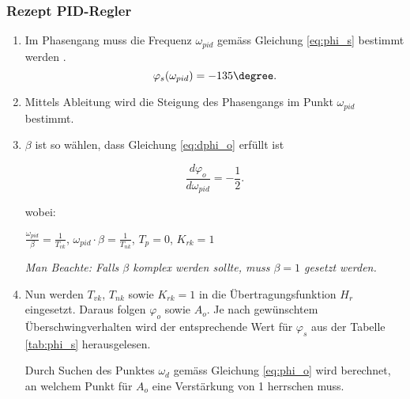 \clearpage
\subsubsection{Rezept PID-Regler}


\begin{enumerate}
    \item
        Im  Phasengang muss  die  Frequenz  $\omega_{pid}$ gem\"ass  Gleichung
        \ref{eq:phi_s} bestimmt werden \footnotemark[1].
        \begin{equation} \label{eq:phi_s}
            \varphi_s(\omega_{pid}) = -135 \degree.
        \end{equation}
    \item
        Mittels  Ableitung  wird  die  Steigung des  Phasengangs  im  Punkt  $
        \omega_{pid} $ bestimmt.
    \item
        $\beta$ ist so w\"ahlen, dass Gleichung \ref{eq:dphi_o} erf\"ullt ist

        \begin{equation} \label{eq:dphi_o}
            \frac{d\varphi_o}{d\omega_{pid}}= -\frac{1}{2}.
        \end{equation}

        wobei:
        \vspace*{1em}

        \begin{center}
            $\frac{\omega_{pid}}{\beta}=\frac{1}{T_{vk}}$,
            $\omega_{pid} \cdot \beta=\frac{1}{T_{nk}}$,
            $T_p = 0$,
            $K_{rk} = 1$
        \end{center}

        \vspace*{1em}
        {\em{Man Beachte: Falls $\beta$ komplex werden sollte, muss $\beta=1$ gesetzt werden.}}
        \vspace*{1em}
    \item
        Nun   werden    $T_{vk}$,   $T_{nk}$   sowie   $K_{rk}=1$    in   die
        \"Ubertragungsfunktion  $H_r$  eingesetzt. Daraus folgen  $\varphi_o$
        sowie $A_o$.   Je nach  gew\"unschtem \"Uberschwingverhalten  wird der
        entsprechende Wert  f\"ur $\varphi_s$ aus der  Tabelle \ref{tab:phi_s}
        herausgelesen.

        Durch Suchen des Punktes  $\omega_d$ gem\"ass Gleichung \ref{eq:phi_o}
        wird berechnet, an welchem Punkt  f\"ur $A_o$ eine Verst\"arkung von 1
        herrschen muss.


\end{enumerate}
